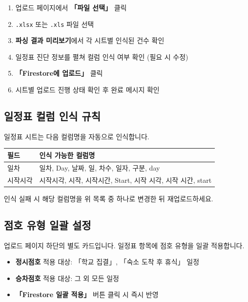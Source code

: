 \documentclass[a4paper,11pt]{article}
\begin{document}
\begin{tcolorbox}[stepbox]
\begin{enumerate}
  \item 업로드 페이지에서 \textbf{「파일 선택」} 클릭
  \item \texttt{.xlsx} 또는 \texttt{.xls} 파일 선택
  \item \textbf{파싱 결과 미리보기}에서 각 시트별 인식된 건수 확인
  \item 일정표 진단 정보를 펼쳐 컬럼 인식 여부 확인 (필요 시 수정)
  \item \textbf{「Firestore에 업로드」} 클릭
  \item 시트별 업로드 진행 상태 확인 후 완료 메시지 확인
\end{enumerate}
\end{tcolorbox}

\subsection{일정표 컬럼 인식 규칙}

일정표 시트는 다음 컬럼명을 자동으로 인식합니다.

\begin{center}
\begin{tabular}{@{}ll@{}}
  \toprule
  \textbf{필드} & \textbf{인식 가능한 컬럼명} \\
  \midrule
  일차 & 일차, Day, 날짜, 일, 차수, 일자, 구분, day \\
  시작시각 & 시작시각, 시작, 시작시간, Start, 시작 시각, 시작 시간, start \\
  \bottomrule
\end{tabular}
\end{center}

인식 실패 시 해당 컬럼명을 위 목록 중 하나로 변경한 뒤 재업로드하세요.

\subsection{점호 유형 일괄 설정}

업로드 페이지 하단의 별도 카드입니다. 일정표 항목에 점호 유형을 일괄 적용합니다.

\begin{itemize}
  \item \textbf{정시점호} 적용 대상: 「학교 집결」, 「숙소 도착 후 휴식」 일정
  \item \textbf{승차점호} 적용 대상: 그 외 모든 일정
  \item \textbf{「Firestore 일괄 적용」} 버튼 클릭 시 즉시 반영
\end{itemize}
\end{document}
